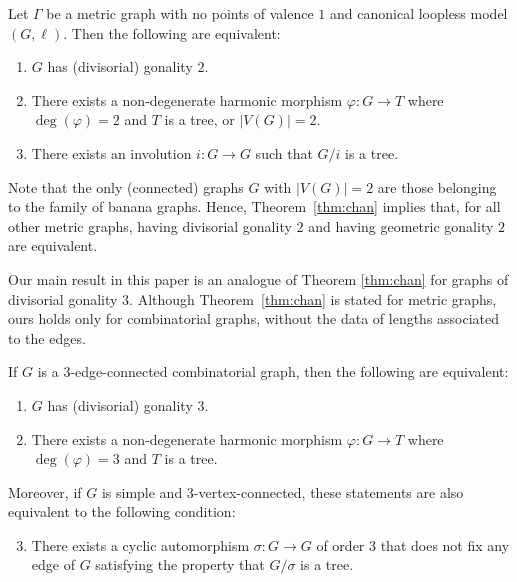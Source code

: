 \documentclass[ALCO,ThmDefs,Unicode,epreuves]{cedram}
\begin{document}
\begin{theorem}\label{thm:chan}
Let $\Gamma$ be a metric graph with no points of valence $1$ and canonical loopless model $(G,\ell)$. Then the following are equivalent:
\begin{enumerate}
 \item\label{theo1.1_1} $G$ has \textup{(}divisorial\textup{)} gonality $2$.
 \item\label{theo1.1_2} There exists a non-degenerate harmonic morphism $\varphi : G \to T$ where $\deg(\varphi) = 2$ and $T$ is a tree, or $|V(G)|=2$.
 \item\label{theo1.1_3} There exists an involution $i:G\rightarrow G$ such that $G/i$ is a tree.
\end{enumerate}
\end{theorem}

Note that the only (connected) graphs $G$ with $|V(G)| = 2$ are those belonging to the family of banana graphs. Hence, Theorem~\ref{thm:chan} implies that, for all other metric graphs, having divisorial gonality $2$ and having geometric gonality $2$ are equivalent.

Our main result in this paper is an analogue of Theorem \ref{thm:chan} for graphs of divisorial gonality $3$. Although Theorem~\ref{thm:chan} is stated for metric graphs, ours holds only for combinatorial graphs, without the data of lengths associated to the edges.


\begin{theorem}
\label{thm:maintheorem}
If $G$ is a $3$-edge-connected combinatorial graph, then the following are equivalent:
\begin{enumerate}
 \item\label{theo1.2_1} $G$ has \textup{(}divisorial\textup{)} gonality $3$.
 \item\label{theo1.2_2} There exists a non-degenerate harmonic morphism $\varphi : G \to T$ where $\deg (\varphi) = 3$ and $T$ is a tree.
\end{enumerate}
Moreover, if $G$ is simple and $3$-vertex-connected, these statements are also equivalent to the following condition: 
\begin{enumerate}\setcounter{enumi}{2}
 \item\label{theo1.2_3}%
 There exists a cyclic automorphism $\sigma: G \to G$ of order $3$ that does not fix any edge of $G$ satisfying the property that $G/\sigma$ is a tree.
\end{enumerate}
\end{theorem}
\end{document}
